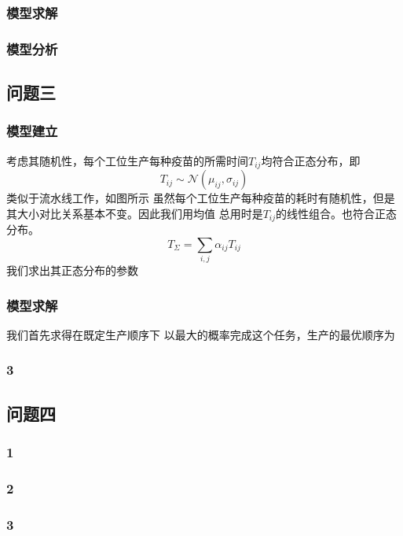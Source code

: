\documentclass[UTF8]{ctexart}
\begin{document}
	\subsubsection{模型求解}
	\subsubsection{模型分析}
	
	\subsection{问题三}
	\subsubsection{模型建立}
	考虑其随机性，每个工位生产每种疫苗的所需时间$T_{ij}$均符合正态分布，即
	\begin{equation}
		T_{ij}\sim\mathcal{N}(\mu_{ij},\sigma_{ij})
	\end{equation}
	类似于流水线工作，如图所示
	虽然每个工位生产每种疫苗的耗时有随机性，但是其大小对比关系基本不变。因此我们用均值
	总用时是$T_{ij}$的线性组合。也符合正态分布。
	\begin{equation}
		T_{\Sigma}=\sum_{i,j}\alpha_{ij}T_{ij}
	\end{equation}
	我们求出其正态分布的参数
	\subsubsection{模型求解}
	我们首先求得在既定生产顺序下
	以最大的概率完成这个任务，生产的最优顺序为
	\subsubsection{3}
	
	\subsection{问题四}
	\subsubsection{1}
	\subsubsection{2}
	\subsubsection{3}
	
\end{document}
